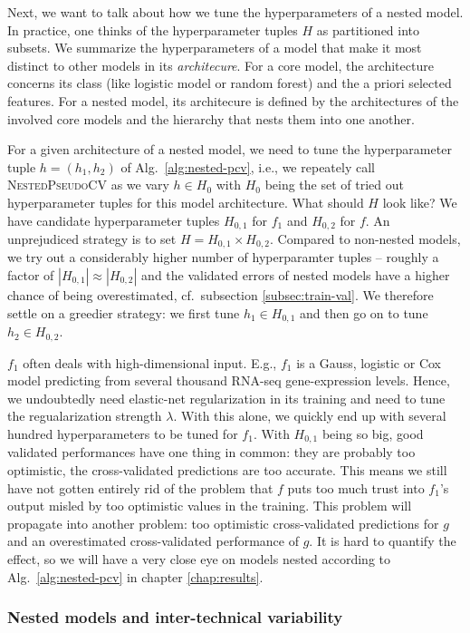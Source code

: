 Next, we want to talk about how we tune the hyperparameters of a nested model. In practice, one thinks of 
the hyperparameter tuples $H$ as partitioned into subsets. We summarize the
hyperparameters of a model that make it most distinct to other models in its \textit{architecure}. 
For a core model, the architecture concerns its class (like logistic model or random forest) and 
the a priori selected features. For a nested model, its architecure is defined by the architectures 
of the involved core models and the hierarchy that nests them into one another.

For a given architecture of a nested model, we need to tune the hyperparameter tuple $h = (h_1, h_2)$ 
of 
Alg.\ \ref{alg:nested-pcv}, i.e., we repeately call \textsc{NestedPseudoCV} as we vary $h \in H_0$
with $H_0$ being the set of tried out hyperparameter tuples for this model architecture. What 
should $H$ look like? We have candidate 
hyperparameter tuples $H_{0, 1}$ for $f_1$ and $H_{0, 2}$ for $f$. An unprejudiced strategy is to 
set $H = H_{0, 1} \times H_{0, 2}$. Compared to non-nested models, we try out a considerably 
higher number of hyperparamter tuples -- roughly a factor of $|H_{0, 1}| \approx |H_{0, 2}|$ and 
the validated errors of nested models have a higher chance 
of being overestimated, cf.\ subsection \ref{subsec:train-val}. We therefore settle on a greedier 
strategy: we first tune $h_1 \in H_{0, 1}$ and then go on to tune $h_2 \in H_{0, 2}$. 

$f_1$ often deals with high-dimensional input. E.g., $f_1$ is a Gauss, logistic or Cox model 
predicting from 
several thousand RNA-seq gene-expression levels. Hence, we undoubtedly need elastic-net 
regularization in its training and need to tune the regualarization strength $\lambda$. 
With this alone, we quickly end up with several hundred hyperparameters to be tuned for $f_1$. 
With $H_{0,1}$ being so big, good validated performances have one thing in common: they are 
probably too optimistic, the cross-validated predictions are too accurate. This means we still 
have not gotten entirely rid of the problem that $f$ puts too much trust into $f_1$'s output 
misled by too optimistic values in the training. This problem will propagate into another
problem: too optimistic cross-validated predictions for $g$ and an overestimated 
cross-validated performance of $g$. It is hard to quantify the effect, so we will have a very close 
eye on models nested according to Alg.\ \ref{alg:nested-pcv} in chapter \ref{chap:results}. 

\subsubsection{Nested models and inter-technical variability}

